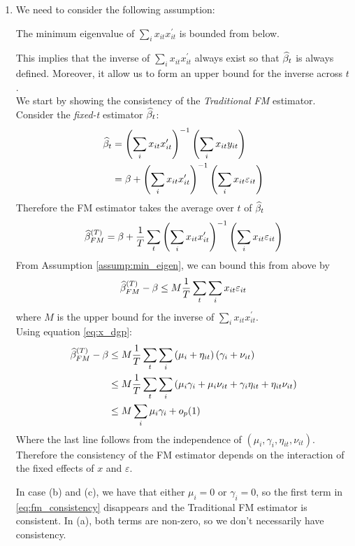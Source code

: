 \begin{solution}
\begin{enumerate}[label = (\alph*)]
    \item  We need to consider the following assumption:
    \begin{assump}
        \label{assump:min_eigen}
        The minimum eigenvalue of \(\sum_i x_{it}x_{it}^\prime\) is bounded from below.
    \end{assump}
    This implies that the inverse of \(\sum_ix_{it}x_{it}^\prime\) always exist so that \(\widehat{\beta}_t\) is always defined. Moreover, it allow us to form an upper bound for the inverse across \(t\). \\
    We start by showing the consistency of the \textit{Traditional FM} estimator. Consider the \emph{fixed-t} estimator \(\widehat{\beta}_t\):
    \begin{align*}
        \widehat{\beta}_t & = \left( \sum_i x_{it}x_{it}^\prime \right)^{-1}\left( \sum_i x_{it}y_{it} \right) \\
        & = \beta + \left( \sum_i x_{it}x_{it}^\prime \right)^{-1}\left( \sum_i x_{it}\varepsilon_{it} \right)
    \end{align*}
    Therefore the FM estimator takes the average over \(t\) of \(\widehat{\beta}_t\)
    \begin{align*}
        \widehat{\beta}^{(T)}_{FM} = \beta + \frac{1}{T}\sum_t\left( \sum_i x_{it}x_{it}^\prime \right)^{-1}\left( \sum_i x_{it}\varepsilon_{it} \right)
    \end{align*}
    From Assumption \ref{assump:min_eigen}, we can bound this from above by
    \[
        \widehat{\beta}^{(T)}_{FM}-\beta \leq M\frac{1}{T}\sum_t\sum_i x_{it}\varepsilon_{it}
    \]
    where \(M\) is the upper bound for the inverse of \(\sum_i x_{it}x_{it}^\prime\). \\
    Using equation \ref{eq:x_dgp}:
    \begin{align*}
        \label{eq:fm_consistency}
        \widehat{\beta}^{(T)}_{FM} - \beta & \leq M\frac{1}{T}\sum_t\sum_i \left( \mu_i+\eta_{it} \right)\left( \gamma_i+\nu_{it} \right) \\
        & \leq M\frac{1}{T}\sum_t\sum_i\left( \mu_i\gamma_i + \mu_i\nu_{it} + \gamma_i\eta_{it} + \eta_{it}\nu_{it} \right) \\
        & \leq M\sum_i\mu_i\gamma_i + o_p(1)
    \end{align*}
    Where the last line follows from the independence of \((\mu_i, \gamma_i, \eta_{it}, \nu_{it})\). Therefore the consistency of the FM estimator depends on the interaction of the fixed effects of \(x\) and \(\varepsilon\). 
    
    In case (b) and (c), we have that either \(\mu_i = 0\) or \(\gamma_i = 0\), so the first term in \eqref{eq:fm_consistency} disappears and the Traditional FM estimator is consistent. In (a), both terms are non-zero, so we don't necessarily have consistency. \\


\end{enumerate}
\end{solution}
